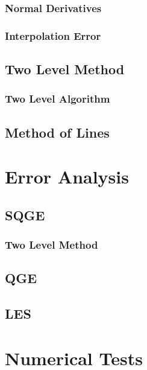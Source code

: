 \documentclass[proposal]{VTthesis}
\begin{document}
      \subsection{Normal Derivatives} \label{sse:Normals} 
      
      \subsection{Interpolation Error} \label{sse:IntErr}
      
    \section{Two Level Method} \label{sec:TwoLevel}
    
      \subsection{Two Level Algorithm} \label{sse:Algorithm}
      
    \section{Method of Lines} \label{sec:MoL}
    
  
  \chapter{Error Analysis} \label{ch:Errors}
    \section{SQGE} \label{sec:SQGEErrors}
    
      \subsection{Two Level Method} \label{sse:SQGE2LE}
      
    \section{QGE} \label{sec:QGEError}
    
    \section{LES} \label{sec:LESError}
    

  \chapter{Numerical Tests} \label{ch:Tests}
\end{document}
